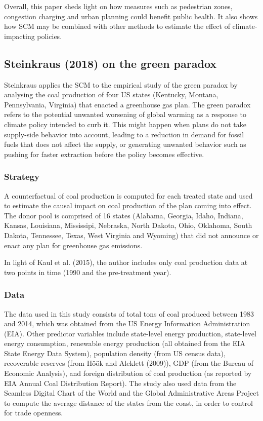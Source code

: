 \documentclass[12pt,a4paper,draft]{article}
\begin{document}
Overall, this paper sheds light on how measures such as pedestrian zones, congestion 
charging and urban planning could benefit public health. It also shows how SCM may 
be combined with other methods to estimate the effect of climate-impacting policies.


\subsection{Steinkraus (2018) on the green paradox}
Steinkraus applies the SCM to the empirical study of the green paradox by analysing the coal 
production of four US states (Kentucky, Montana, Pennsylvania, Virginia) that enacted a 
greenhouse gas plan. 
The green paradox refers to the potential unwanted worsening of global warming as a 
response to climate policy intended to curb it. 
This might happen when plans do not take supply-side behavior into 
account, leading to a reduction in demand for fossil fuels that does not affect the supply, 
or generating unwanted behavior such as pushing for faster extraction before the policy 
becomes effective. 



\subsubsection{Strategy}
A counterfactual of coal production is computed for each treated state and used to 
estimate the causal impact on coal production of the plan coming into effect. 
The donor pool is comprised of 16 states (Alabama, Georgia, Idaho, Indiana, Kansas, 
Louisiana, Mississipi, Nebraska, North Dakota, Ohio, Oklahoma, South Dakota, Tennessee, 
Texas, West Virginia and Wyoming) that did not announce or enact any plan for 
greenhouse gas emissions.

In light of Kaul et al. (2015), the author includes only coal production data at two 
points in time (1990 and the pre-treatment year).


\subsubsection{Data}
The data used in this study consists of total tons of coal produced between 1983 and 
2014, which was obtained from the US Energy Information Administration (EIA).
Other predictor variables include state-level energy production, state-level energy 
consumption, renewable energy production (all obtained from the EIA State Energy Data 
System), population density (from US census data), recoverable reserves (from Höök and 
Aleklett (2009)), GDP (from the Bureau of Economic Analysis), and foreign distribution 
of coal production (as reported by EIA Annual Coal Distribution Report). 
The study also used data from the Seamless Digital Chart of the World and the Global 
Administrative Areas Project to compute the average distance of the states from the 
coast, in order to control for trade openness.
\end{document}
